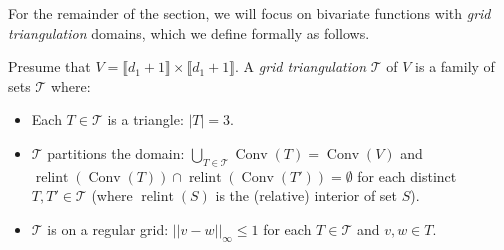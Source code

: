 \documentclass[opre,nonblindrev]{informs3} %
\newcommand{\blue}[1]{{#1}}
\newcommand{\calT}{\mathcal{T}}
\newcommand{\Conv}{\operatorname{Conv}}
\newcommand{\relint}{\operatorname{relint}}
\begin{document}
\blue{
For the remainder of the section, we will focus on bivariate functions with \emph{grid triangulation} domains, which we define formally as follows.
\begin{definition}
    Presume that $V = \llbracket d_1 + 1 \rrbracket \times \llbracket d_1 + 1 \rrbracket$. A \emph{grid triangulation} $\calT$ of $V$ is a family of sets $\calT$ where:
    \begin{itemize}
        \item Each $T \in \calT$ is a triangle: $|T|=3$.
        \item $\calT$ partitions the domain: $\bigcup_{T \in \calT} \Conv(T) = \Conv(V)$ and $\relint(\Conv(T)) \cap \relint(\Conv(T')) = \emptyset$ for each distinct $T, T' \in \calT$ (where $\relint(S)$ is the (relative) interior of set $S$).
        \item $\calT$ is on a regular grid: $||v-w||_\infty \leq 1$ for each $T \in \calT$ and $v,w \in T$.
    \end{itemize}
\end{definition}
}
\end{document}

